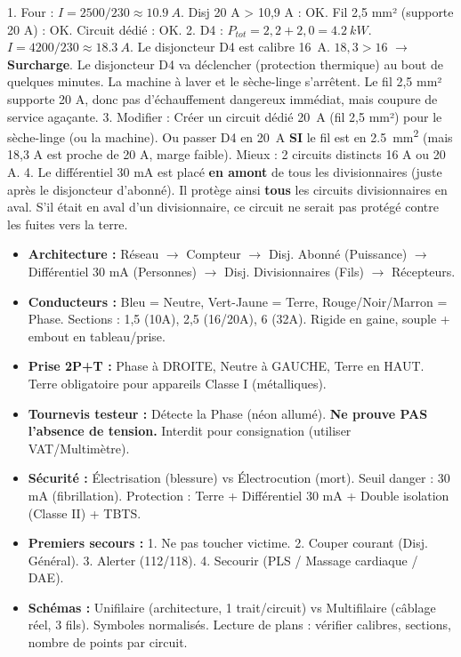 \documentclass[11pt]{article}
\begin{document}
\begin{corrige}
1. Four : $I = 2500/230 \approx \SI{10,9}{A}$. Disj 20 A > 10,9 A : OK. Fil 2,5 mm² (supporte 20 A) : OK. Circuit dédié : OK.
2. D4 : $P_{tot} = 2,2 + 2,0 = \SI{4,2}{kW}$. $I = 4200/230 \approx \SI{18,3}{A}$.
   Le disjoncteur D4 est calibre \SI{16}{A}. $18,3 > 16$ $\rightarrow$ \textbf{Surcharge}. Le disjoncteur D4 va déclencher (protection thermique) au bout de quelques minutes. La machine à laver et le sèche-linge s'arrêtent. Le fil 2,5 mm² supporte 20 A, donc pas d'échauffement dangereux immédiat, mais coupure de service agaçante.
3. Modifier : Créer un circuit dédié \SI{20}{A} (fil 2,5 mm²) pour le sèche-linge (ou la machine). Ou passer D4 en \SI{20}{A} \textbf{SI} le fil est en \SI{2,5}{mm^2} (mais 18,3 A est proche de 20 A, marge faible). Mieux : 2 circuits distincts 16 A ou 20 A.
4. Le différentiel 30 mA est placé \textbf{en amont} de tous les divisionnaires (juste après le disjoncteur d'abonné). Il protège ainsi \textbf{tous} les circuits divisionnaires en aval. S'il était en aval d'un divisionnaire, ce circuit ne serait pas protégé contre les fuites vers la terre.
\end{corrige}

\begin{aretenir}
\begin{itemize}
\item \textbf{Architecture :} Réseau $\rightarrow$ Compteur $\rightarrow$ Disj. Abonné (Puissance) $\rightarrow$ Différentiel 30 mA (Personnes) $\rightarrow$ Disj. Divisionnaires (Fils) $\rightarrow$ Récepteurs.
\item \textbf{Conducteurs :} Bleu = Neutre, Vert-Jaune = Terre, Rouge/Noir/Marron = Phase. Sections : 1,5 (10A), 2,5 (16/20A), 6 (32A). Rigide en gaine, souple + embout en tableau/prise.
\item \textbf{Prise 2P+T :} Phase à DROITE, Neutre à GAUCHE, Terre en HAUT. Terre obligatoire pour appareils Classe I (métalliques).
\item \textbf{Tournevis testeur :} Détecte la Phase (néon allumé). \textbf{Ne prouve PAS l'absence de tension.} Interdit pour consignation (utiliser VAT/Multimètre).
\item \textbf{Sécurité :} Électrisation (blessure) vs Électrocution (mort). Seuil danger : 30 mA (fibrillation). Protection : Terre + Différentiel 30 mA + Double isolation (Classe II) + TBTS.
\item \textbf{Premiers secours :} 1. Ne pas toucher victime. 2. Couper courant (Disj. Général). 3. Alerter (112/118). 4. Secourir (PLS / Massage cardiaque / DAE).
\item \textbf{Schémas :} Unifilaire (architecture, 1 trait/circuit) vs Multifilaire (câblage réel, 3 fils). Symboles normalisés. Lecture de plans : vérifier calibres, sections, nombre de points par circuit.
\end{itemize}
\end{aretenir}
\end{document}
